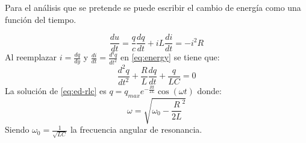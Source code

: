 \documentclass[spanish,notitlepage,letterpaper, 12pt]{article}
\begin{document}
\newpage
Para el análisis que se pretende se puede escribir el cambio de energía como una función del tiempo. \cite{serway_jewett_2017}\par
\begin{equation}\label{eq:energy}
    \frac{du}{dt}=\frac{q}{c}\frac{dq}{dt}+iL\frac{di}{dt}=-i^{2}R
\end{equation}
Al reemplazar $i=\frac{dq}{dy}$ y $\frac{di}{dt}=\frac{d^qq}{dt^2}$ en \eqref{eq:energy} se tiene que:
\begin{equation}\label{eq:ed-rlc}
    \frac{d^2q}{dt^2}+\frac{R}{L}\frac{dq}{dt}+\frac{q}{LC}=0
\end{equation}
La solución de \eqref{eq:ed-rlc} es $q=q_{max}e^{-\frac{Rt}{2L}}\cos{(\omega t)}$ donde:
\begin{equation}\label{eq:frequency}
    \omega=\sqrt{\omega_0-\frac{R}{2L}^2}
\end{equation}
    Siendo $\omega_0=\frac{1}{\sqrt{LC}}$ la frecuencia angular de resonancia.
\end{document}
